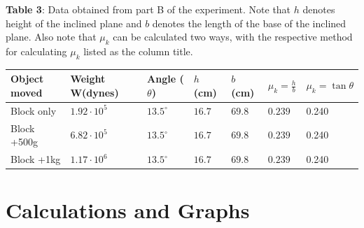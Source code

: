 \documentclass{article}
\theoremstyle{definition}
\begin{document}
\textbf{Table 3}: Data obtained from part B of the experiment. Note that $h$ denotes height
of the inclined plane and $b$ denotes the length of the base of the inclined plane. Also note 
that $\mu_k$ can be calculated two ways, with the respective method for calculating $\mu_k$ listed as the column title. 
\begin{center}
    \begin{tabular}{|m{4em} | m{1.5cm} | m{0.8cm} | m{1.3cm} | m{1.3cm} | m{1.4cm} |m{1.7cm}|} 
    \hline
    Object moved & Weight W(dynes) & Angle ($\theta$) & $h$ (cm) & $b$ (cm) & $\mu_k = \frac{h}{b}$ & $\mu_k = \tan\theta$\\ 
    \hline\hline
    Block only & $1.92 \cdot 10^5$ & $13.5^\circ$ & $16.7$ & $69.8$ & $0.239$ & 0.240\\ 
    \hline
    Block +500g & $6.82 \cdot 10^5$ & $13.5^\circ$ & $16.7$ & $69.8$ & $0.239$ & 0.240\\ 
    \hline
    Block +1kg & $1.17 \cdot 10^6$ & $13.5^\circ$ & $16.7$ & $69.8$ & $0.239$ & 0.240\\ 
    \hline
   \end{tabular}
\end{center}
\section{Calculations and Graphs}
\end{document}
